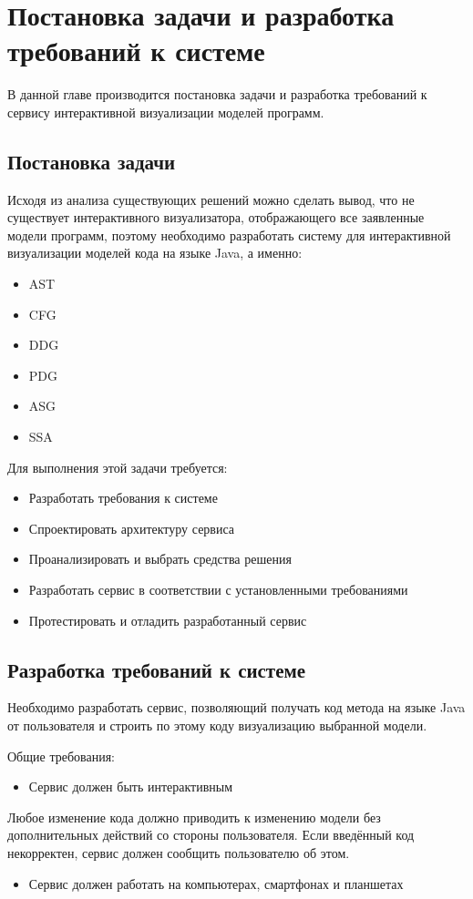 \chapter{Постановка задачи и разработка требований к системе} \label{ch3}
В данной главе производится постановка задачи и разработка требований к сервису интерактивной визуализации моделей программ.
\section{Постановка задачи} \label{ch3:sec1}
Исходя из анализа существующих решений можно сделать вывод, что не существует интерактивного визуализатора, отображающего все заявленные модели программ, поэтому необходимо разработать систему для интерактивной визуализации моделей кода на языке Java, а именно:
\begin{itemize}
\item AST
\item CFG
\item DDG
\item PDG
\item ASG
\item SSA
\end{itemize}

Для выполнения этой задачи требуется:
\begin{itemize}
\item Разработать требования к системе
\item Спроектировать архитектуру сервиса
\item Проанализировать и выбрать средства решения
\item Разработать сервис в соответствии с установленными требованиями
\item Протестировать и отладить разработанный сервис
\end{itemize}
\section{Разработка требований к системе} \label{ch3:sec2}

Необходимо разработать сервис, позволяющий получать код метода на языке Java от пользователя и строить по этому коду визуализацию выбранной модели.

Общие требования:
\begin{itemize}
\item Сервис должен быть интерактивным
\end{itemize}

Любое изменение кода должно приводить к изменению модели без дополнительных действий со стороны пользователя. Если введённый код некорректен, сервис должен сообщить пользователю об этом.
\begin{itemize}
\item Сервис должен работать на компьютерах, смартфонах и планшетах
\end{itemize}

